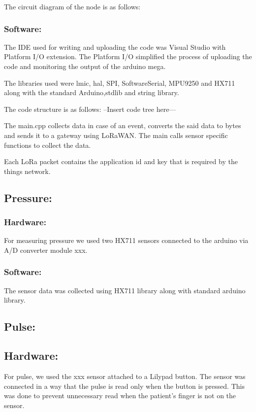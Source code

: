 The circuit diagram of the node is as follows:



\subsubsection{Software:}
The IDE used for writing and uploading the code was Visual Studio with Platform I/O extension. The Platform I/O simplified the process of uploading the code and monitoring the output of the arduino mega.

The libraries used were lmic, hal, SPI, SoftwareSerial, MPU9250 and HX711 along with the standard Arduino,stdlib and string library.

The code structure is as follows:
--Insert code tree here---

The main.cpp collects data in case of an event, converts the said data to bytes and sends it to a gateway using LoRaWAN. The main calls sensor specific functions to collect the data. 

Each LoRa packet contains the application id and key that is required by the things network.

\subsection{Pressure:}

\subsubsection{Hardware:}
For measuring pressure we used two HX711 sensors connected to the arduino via A/D converter module xxx. 

\subsubsection{Software:}
The sensor data was collected using HX711 library along with standard arduino library.

\subsection{Pulse:}


\subsection{Hardware:}
For pulse, we used the xxx sensor attached to a Lilypad button. The sensor was connected in a way that the pulse is read only when the button is pressed. This was done to prevent unnecessary read when the patient's finger is not on the sensor.


